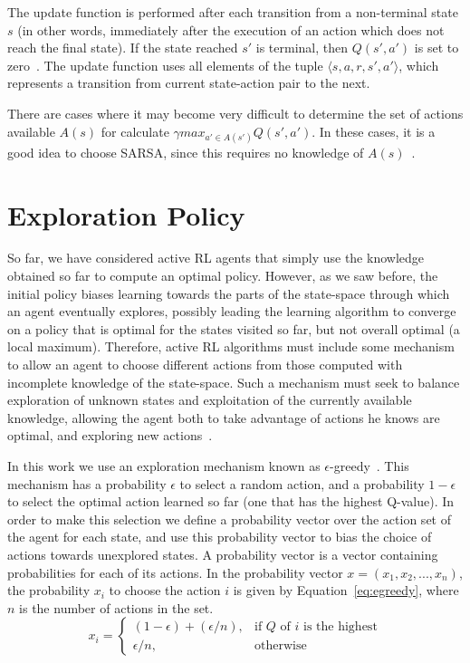 The update function is performed after each transition from a non-terminal state $s$ (in other words, immediately after the execution of an action which does not reach the final state).
If the state reached $s'$ is terminal, then $Q(s',a')$ is set to zero~\cite{sutton1998reinforcement}.
The update function uses all elements of the tuple $\langle s,a,r,s',a' \rangle$, which represents a transition from current state-action pair to the next.

There are cases where it may become very difficult to determine the set of actions available $A(s)$ for calculate $\gamma max_{a' \in A(s')}Q(s',a')$.
In these cases, it is a good idea to choose SARSA, since this requires no knowledge of $A(s)$~\cite{graepel2004learningfight}.



\section{Exploration Policy}
\label{sec:exploration}

So far, we have considered active RL agents that simply use the knowledge obtained so far to compute an optimal policy. 
However, as we saw before, the initial policy biases learning towards the parts of the state-space through which an agent eventually explores, possibly leading the learning algorithm to converge on a policy that is optimal for the states visited so far, but not overall optimal (a local maximum). 
Therefore, active RL algorithms must include some mechanism to allow an agent to choose different actions from those computed with incomplete knowledge of the state-space. 
Such a mechanism must seek to balance exploration of unknown states and exploitation of the currently available knowledge, allowing the agent both to take advantage of actions he knows are optimal, and exploring new actions~\cite{amato2010highlevel}. 

In this work we use an exploration mechanism known as $\epsilon$-greedy~\cite{rodrigues2009dynamic}. 
This mechanism has a probability $\epsilon$ to select a random action, and a probability $1 - \epsilon$ to select the optimal action learned so far (one that has the highest Q-value).
In order to make this selection we define a probability vector over the action set of the agent for each state, and use this probability vector to bias the choice of actions towards unexplored states.
A probability vector is a vector containing probabilities for each of its actions.
In the probability vector $x = (x_1, x_2, ..., x_n)$, the probability $x_i$ to choose the action $i$ is given by Equation~\ref{eq:egreedy}, where $n$ is the number of actions in the set.
\begin{equation} \label{eq:egreedy}
	x_i = \left\{
  \begin{array}{ll}
    (1 - \epsilon) + (\epsilon / n), & \mbox{if $Q$ of $i$ is the highest} \\
    \epsilon / n, & \mbox{otherwise}
  \end{array}\right.
\end{equation}



